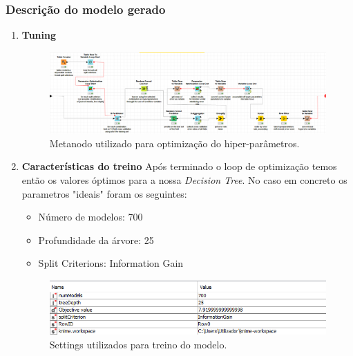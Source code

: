     \subsubsection{Descrição do modelo gerado}
        \begin{enumerate}
            \item \textbf{Tuning}    
                \begin{figure}[H]
                    \centering
                    \includegraphics[scale=0.30
                    ]{Figures/wf_braga_hyper.png}
                    \caption{Metanodo utilizado para optimização do hiper-parâmetros.}
                    \label{fig:"um"}
                \end{figure} 
                
            \item \textbf{Características do treino}
                Após terminado o loop de optimização temos então os valores óptimos para a nossa \textit{Decision Tree}. No caso em concreto os parametros "ideais" foram os seguintes:
                \begin{itemize}
                    \item Número de modelos: 700
                    \item Profundidade da árvore: 25
                    \item Split Criterions: Information Gain
                \end{itemize}
                \begin{figure}[H]
                    \centering
                    \includegraphics[scale=0.30
                    ]{Figures/wf_braga_hyperdata.png}
                    \caption{Settings utilizados para treino do modelo.}
                    \label{fig:"um"}
                \end{figure} 
        \end{enumerate}